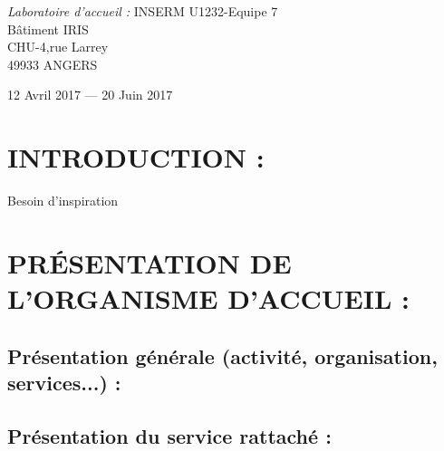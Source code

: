 \documentclass[a4paper,10pt]{article}
\newcommand\tabA[1][0.5cm]{\hspace*{#1}}
\newcommand\tabC[1][2cm]{\hspace*{#1}}
\begin{document}
\begin{titlepage}
\begin{sffamily}
\begin{center}
\begin{minipage}{9\textwidth}
\begin{doublespace}
\begin{tabular}{cl}
    \end{tabular}
     \end{doublespace}
    \emph{Laboratoire d'accueil :} \tabC \tabA \textsc{INSERM U1232}-Equipe 7
    \\\tabC \tabC \tabC \tabA Bâtiment IRIS 
    \\\tabC \tabC \tabC \tabA CHU-4,rue Larrey 
    \\\tabC \tabC \tabC \tabA 49933 ANGERS
    \end{minipage}
    \vspace*{\fill}
%  

    {\large 12 Avril 2017 — 20 Juin 2017}

  \end{center}
  \end{sffamily}
\end{titlepage}
\newpage
\tableofcontents
\newpage
\section{INTRODUCTION :}
Besoin d'inspiration
\section{PR\'{E}SENTATION DE L'ORGANISME D'ACCUEIL :}
\subsection{Présentation générale (activité, organisation, services...) :}
\subsection{Présentation du service rattaché :}
\end{document}
